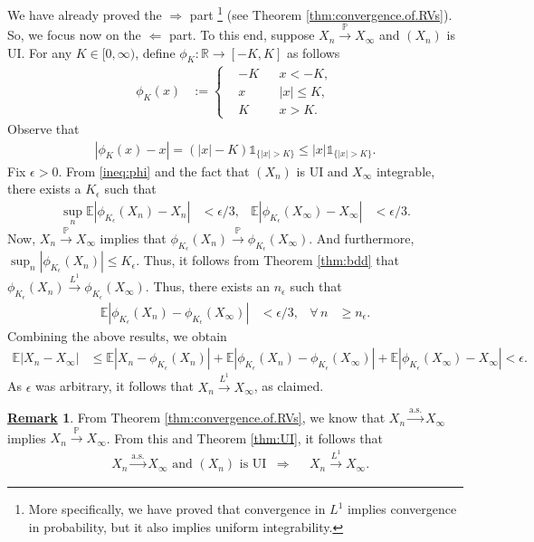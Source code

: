 \documentclass[12pt]{book}
\let\varepsilon\epsilon
\numberwithin{equation}{chapter}
\theoremstyle{plain}
\numberwithin{theorem}{section}
\theoremstyle{definition}
\newtheorem{remark}[theorem]{\underline{Remark}}
\numberwithin{exercise}{chapter}
\let\oldendproof\endproof
\renewenvironment{proof}[1][\proofname]{%
  \oldproof[\scshape\underline{#1}]%
}{\oldendproof}
\newcommand{\<}{\langle}
\renewcommand{\>}{\rangle}
\renewcommand{\(}{\left(}
\renewcommand{\)}{\right)}
\renewcommand{\[}{\left[}
\renewcommand{\]}{\right]}
\newcommand\Eb{\mathds{E}}
\newcommand\Ib{\mathds{1}} 	%
\newcommand\Pb{\mathds{P}}
\newcommand\Rb{\mathds{R}}
\newcommand\eps{\varepsilon}
\begin{document}
\begin{proof}
We have already proved the $\Rightarrow$ part
\footnote{More specifically, we have proved that convergence in $L^1$ implies convergence in probability, but it also implies uniform integrability.}
(see Theorem \ref{thm:convergence.of.RVs}).  So, we focus now on the $\Leftarrow$ part.  To this end, suppose $X_n \stackrel{\Pb}{\to} X_\infty$ and $(X_n)$ is UI.  For any $K \in [0,\infty)$, define $\phi_K : \Rb \to [-K,K]$ as follows
\begin{align}
\phi_K(x)
	&:= \left\{ \begin{aligned}
			& -K && x < -K , \\
			& x && |x| \leq K ,\\
			& K && x > K .
			\end{aligned} \right.
\end{align}
Observe that
\begin{align}
|\phi_K(x) - x| = (|x|-K) \Ib_{\{|x|>K\}} \leq |x| \Ib_{\{|x|>K\}} . \label{ineq:phi}
\end{align}
Fix $\eps > 0$.  From \eqref{ineq:phi} and the fact that $(X_n)$ is UI and $X_\infty$ integrable, there exists a $K_\eps$ such that
\begin{align}
\sup_n \Eb | \phi_{K_\eps}(X_n) - X_n | &< \eps/3 , &
\Eb | \phi_{K_\eps}(X_\infty) - X_\infty | &< \eps/3 .
\end{align}
Now, $X_n \stackrel{\Pb}{\to} X_\infty$ implies that $\phi_{K_\eps}(X_n) \stackrel{\Pb}{\to} \phi_{K_\eps}(X_\infty)$.  And furthermore, $\sup_n|\phi_{K_\eps}(X_n)| \leq {K_\eps}$.  Thus, it follows from Theorem \ref{thm:bdd} that $\phi_{K_\eps}(X_n) \stackrel{L^1}{\to} \phi_{K_\eps}(X_\infty)$.  Thus, there exists an $n_\eps$ such that
\begin{align}
\Eb | \phi_{K_\eps}(X_n) - \phi_{K_\eps}(X_\infty) | 
	&< \eps/3 , &
\forall \, n
	&\geq n_\eps .
\end{align}
Combining the above results, we obtain
\begin{align}
\Eb | X_n - X_\infty |
	&\leq \Eb | X_n - \phi_{K_\eps}(X_n) | + \Eb | \phi_{K_\eps}(X_n) - \phi_{K_\eps}(X_\infty) | + \Eb | \phi_{K_\eps}(X_\infty) - X_\infty | 
	 < \eps .
\end{align}
As $\eps$ was arbitrary, it follows that $X_n \stackrel{L^1}{\to} X_\infty$, as claimed.
\end{proof}

\begin{remark}
From Theorem \ref{thm:convergence.of.RVs}, we know that $X_n \stackrel{\text{a.s.}}{\to} X_\infty$ implies $X_n \stackrel{\Pb}{\to} X_\infty$.  From this and Theorem \ref{thm:UI}, it follows that
\begin{align}
&\text{$X_n \stackrel{\text{a.s.}}{\to} X_\infty$ and $(X_n)$ is UI}
&\Rightarrow&
&X_n \stackrel{L^1}{\to} X_\infty.
\end{align}
\end{remark}
\end{document}
